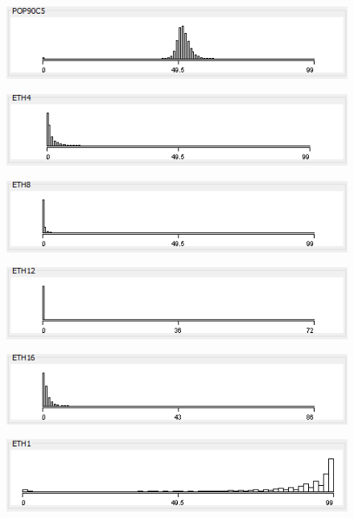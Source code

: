 \begin{figure}
\includegraphics{./images/expl_rep/Cattura3-2-0}
\end{figure}
\begin{figure}
\includegraphics{./images/expl_rep/Cattura3-2-1}
\end{figure}
\begin{figure}
\includegraphics{./images/expl_rep/Cattura3-2-2}
\end{figure}
\begin{figure}
\includegraphics{./images/expl_rep/Cattura3-2-3}
\end{figure}
\begin{figure}
\includegraphics{./images/expl_rep/Cattura3-2-4}
\end{figure}
\begin{figure}
\includegraphics{./images/expl_rep/Cattura3-3-0}
\end{figure}
